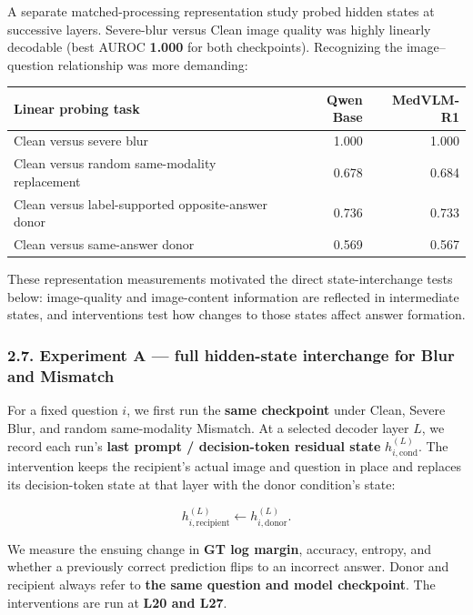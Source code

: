 \documentclass[
  10pt,
  a4paper,
]{article}
\newcounter{none} %
\begin{document}
A separate matched-processing representation study probed hidden states
at successive layers. Severe-blur versus Clean image quality was highly
linearly decodable (best AUROC \textbf{1.000} for both checkpoints).
Recognizing the image--question relationship was more demanding:

{\def\LTcaptype{none} %
\begin{longtable}[]{@{}lrr@{}}
\toprule\noalign{}
Linear probing task & Qwen Base & MedVLM-R1 \\
\midrule\noalign{}
\endhead
\bottomrule\noalign{}
\endlastfoot
Clean versus severe blur & 1.000 & 1.000 \\
Clean versus random same-modality replacement & 0.678 & 0.684 \\
Clean versus label-supported opposite-answer donor & 0.736 & 0.733 \\
Clean versus same-answer donor & 0.569 & 0.567 \\
\end{longtable}
}

These representation measurements motivated the direct state-interchange
tests below: image-quality and image-content information are reflected
in intermediate states, and interventions test how changes to those
states affect answer formation.

\subsubsection{2.7. Experiment A --- full hidden-state interchange for
Blur and
Mismatch}\label{experiment-a-full-hidden-state-interchange-for-blur-and-mismatch}

For a fixed question \(i\), we first run the \textbf{same checkpoint}
under Clean, Severe Blur, and random same-modality Mismatch. At a
selected decoder layer \(L\), we record each run's \textbf{last prompt /
decision-token residual state} \(h_{i,\mathrm{cond}}^{(L)}\). The
intervention keeps the recipient's actual image and question in place
and replaces its decision-token state at that layer with the donor
condition's state:

\[h_{i,\mathrm{recipient}}^{(L)}\leftarrow h_{i,\mathrm{donor}}^{(L)}.\]

We measure the ensuing change in \textbf{GT log margin}, accuracy,
entropy, and whether a previously correct prediction flips to an
incorrect answer. Donor and recipient always refer to \textbf{the same
question and model checkpoint}. The interventions are run at \textbf{L20
and L27}.
\end{document}
